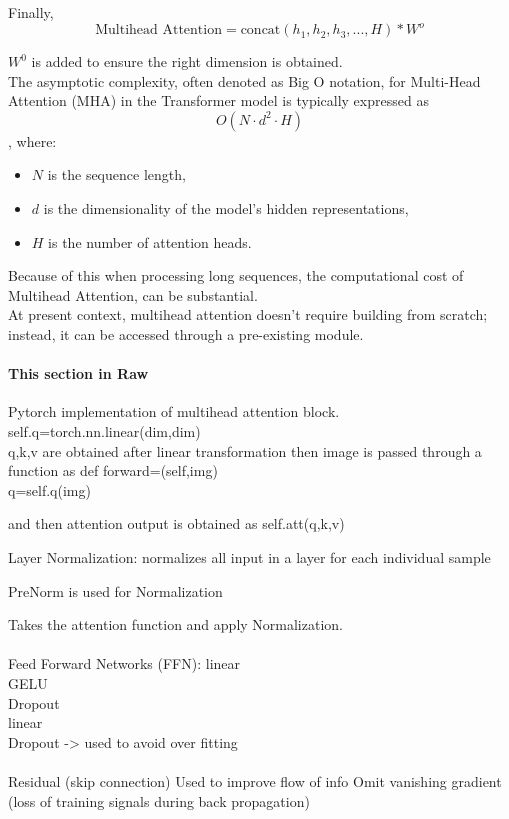 Finally, \[\text{Multihead Attention} = \text{concat} (h_1, h_2, h_3,...,H)* W^o \]

$W^0$ is added to ensure the right dimension is obtained.\\

The asymptotic complexity, often denoted as Big O notation, for Multi-Head Attention (MHA) in the Transformer model is typically expressed as\[ O(N \cdot d^2 \cdot H)\], where:
\begin{itemize}
  \item $N$ is the sequence length,
  \item $d$ is the dimensionality of the model's hidden representations,
  \item $H$ is the number of attention heads.
\end{itemize}
Because of this when processing long sequences, the computational cost of Multihead Attention, can be substantial.\\

At present context, multihead attention doesn't require building from scratch; instead, it can be accessed through a pre-existing module.

\paragraph*{This section in Raw}
Pytorch implementation of multihead attention block.
self.q=torch.nn.linear(dim,dim)\\
q,k,v are obtained after linear transformation
then image is passed through a function as 
def forward=(self,img)\\
q=self.q(img)


and then attention output is obtained as self.att(q,k,v)

Layer Normalization: normalizes all input in a layer for each individual sample

PreNorm is used for Normalization

Takes the attention function and apply Normalization.\\
\\

Feed Forward  Networks (FFN):
linear\\
GELU\\
Dropout\\
linear\\
Dropout -> used to avoid over fitting\\
\\
Residual (skip connection)
Used to improve flow of info 
Omit vanishing gradient (loss of training signals during back propagation)





\newpage